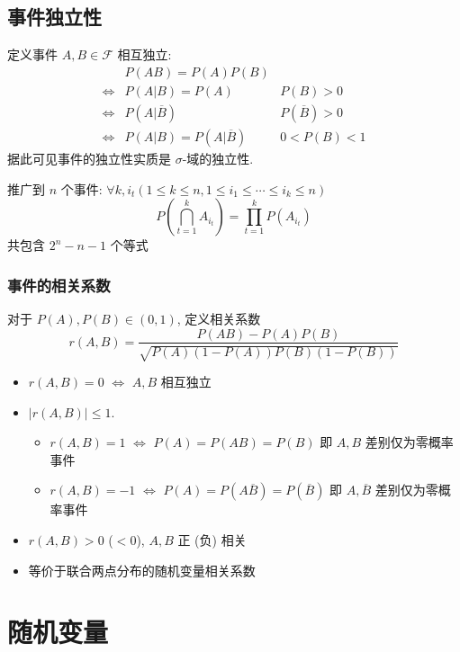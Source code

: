 \documentclass[11pt,a4paper,twocolumn]{article} %
\numberwithin{equation}{section} %
\begin{document}
\subsection{事件独立性} %
\label{sub:dependency}
定义事件 $A, B\in\mathscr F$ 相互独立: 
\begin{align*}
	& P(AB) = P(A)P(B) \\
	\Leftrightarrow & P(A|B) = P(A)  & P(B)>0\\
	\Leftrightarrow & P(A|\overline B) & P(\overline B)>0\\
	\Leftrightarrow & P(A|B) = P(A|\overline B) & 0<P(B)<1
\end{align*}
据此可见事件的独立性实质是 $\sigma$-域的独立性.

推广到 $n$ 个事件: $\forall k, i_t (1\le k \le n, 1\le i_1\le\cdots\le i_k\le n)$
$$
  P\left(\bigcap_{t=1}^k A_{i_t}\right) = \prod_{t=1}^k P(A_{i_t})
$$
共包含 $2^n-n-1$ 个等式
\subsubsection{事件的相关系数} %
\label{ssub:correlation}
对于 $P(A), P(B) \in (0,1)$, 定义相关系数
\begin{equation}\label{equ:event_corelation}
	r(A,B) = \frac{P(AB) - P(A)P(B)}{\sqrt{P(A)(1-P(A)) P(B)(1-P(B))}}
\end{equation}
\begin{itemize}
	\item $r(A, B) = 0$ $\Leftrightarrow$ $A, B$ 相互独立
	\item $|r(A,B)|\le 1$. 
	\begin{itemize}
		\item $r(A,B) = 1$ $\Leftrightarrow$ $P(A) = P(AB) = P(B)$ 即
		$A, B$ 差别仅为零概率事件
		\item $r(A,B) = -1$ $\Leftrightarrow$ 
		$P(A) = P(A\overline B) = P(\overline B)$ 即 
		$A, \overline B$ 差别仅为零概率事件
	\end{itemize}
	\item $r(A,B) > 0$ ($<0$), $A, B$ 正 (负) 相关
	\item 等价于联合两点分布的随机变量相关系数
\end{itemize}
\section{随机变量} %
\label{sec:variable}
\end{document}
